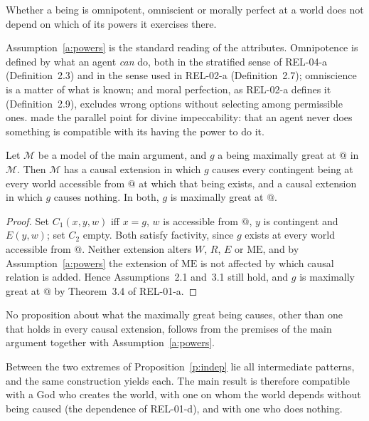 \documentclass{situationist-preprint}
\begin{document}
\begin{assumption}\label{a:powers}
Whether a being is omnipotent, omniscient or morally perfect at a world does not depend on which of its powers it exercises there.
\end{assumption}

Assumption~\ref{a:powers} is the standard reading of the attributes. Omnipotence is defined by what an agent \emph{can} do, both in the stratified sense of REL-04-a (Definition~2.3) and in the sense used in REL-02-a (Definition~2.7); omniscience is a matter of what is known; and moral perfection, as REL-02-a defines it (Definition~2.9), excludes wrong options without selecting among permissible ones. \citet{Pike1969} made the parallel point for divine impeccability: that an agent never does something is compatible with its having the power to do it.

\begin{proposition}\label{p:indep}
Let $\mathcal{M}$ be a model of the main argument, and $g$ a being maximally great at $@$ in $\mathcal{M}$. Then $\mathcal{M}$ has a causal extension in which $g$ causes every contingent being at every world accessible from $@$ at which that being exists, and a causal extension in which $g$ causes nothing. In both, $g$ is maximally great at $@$.
\end{proposition}

\begin{proof}
Set $C_1(x,y,w)$ iff $x = g$, $w$ is accessible from $@$, $y$ is contingent and $E(y,w)$; set $C_2$ empty. Both satisfy factivity, since $g$ exists at every world accessible from $@$. Neither extension alters $W$, $R$, $E$ or $\mathrm{ME}$, and by Assumption~\ref{a:powers} the extension of $\mathrm{ME}$ is not affected by which causal relation is added. Hence Assumptions~2.1 and~3.1 still hold, and $g$ is maximally great at $@$ by Theorem~3.4 of REL-01-a.
\end{proof}

\begin{corollary}\label{c:none}
No proposition about what the maximally great being causes, other than one that holds in every causal extension, follows from the premises of the main argument together with Assumption~\ref{a:powers}.
\end{corollary}

Between the two extremes of Proposition~\ref{p:indep} lie all intermediate patterns, and the same construction yields each. The main result is therefore compatible with a God who creates the world, with one on whom the world depends without being caused (the dependence of REL-01-d), and with one who does nothing.
\end{document}
